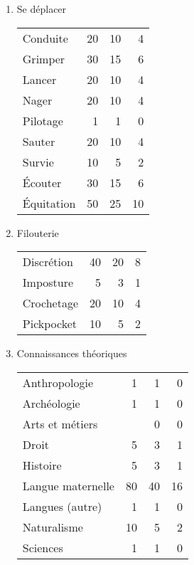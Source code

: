 \documentclass[11pt]{article}
\begin{document}
\begin{twocols}
\begin{enumerate}
\item Se déplacer
\label{sec:orgc17ec45}

\begin{center}
\begin{tabular}{lrrr}
Conduite & 20 & 10 & 4\\
Grimper & 30 & 15 & 6\\
Lancer & 20 & 10 & 4\\
Nager & 20 & 10 & 4\\
Pilotage & 1 & 1 & 0\\
Sauter & 20 & 10 & 4\\
Survie & 10 & 5 & 2\\
Écouter & 30 & 15 & 6\\
Équitation & 50 & 25 & 10\\
\end{tabular}
\end{center}

\item Filouterie
\label{sec:org3079484}

\begin{center}
\begin{tabular}{lrrr}
Discrétion & 40 & 20 & 8\\
Imposture & 5 & 3 & 1\\
Crochetage & 20 & 10 & 4\\
Pickpocket & 10 & 5 & 2\\
\end{tabular}
\end{center}

\item Connaissances théoriques
\label{sec:org20d4c39}

\begin{center}
\begin{tabular}{lrrr}
Anthropologie & 1 & 1 & 0\\
Archéologie & 1 & 1 & 0\\
Arts et métiers &  & 0 & 0\\
Droit & 5 & 3 & 1\\
Histoire & 5 & 3 & 1\\
Langue maternelle & 80 & 40 & 16\\
Langues (autre) & 1 & 1 & 0\\
Naturalisme & 10 & 5 & 2\\
Sciences & 1 & 1 & 0\\
\end{tabular}
\end{center}


\end{enumerate}
\end{twocols}
\end{document}
